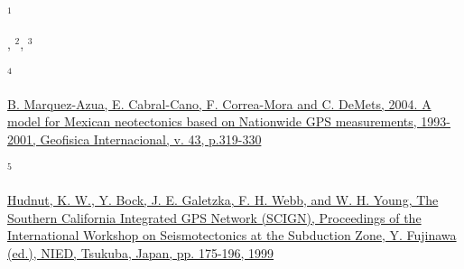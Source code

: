 \begin{landscape}
\begin{minipage}{0.9\linewidth}
      \hypertarget{Hudnut}{${}^1$}\citet{Hudnut:2002},
      \hypertarget{Garnier}{${}^2$}\citet{Garnier:2021}, 
      \hypertarget{Graham}{${}^3$}\citet{Graham:2016}
      
      \hypertarget{Marquez}{${}^4$}\href{https://doi.org/10.7283/T58S4N9N}{B. Marquez-Azua, E. Cabral-Cano, F. Correa-Mora and C. DeMets, 2004. A model for Mexican neotectonics based on Nationwide GPS measurements, 1993-2001, Geofisica Internacional, v. 43, p.319-330}
      
      \hypertarget{Hudnut2}{${}^5$}\href{https://doi.org/10.7283/T5668BHN}{Hudnut, K. W., Y. Bock, J. E. Galetzka, F. H. Webb, and W. H. Young, The Southern California Integrated GPS Network (SCIGN), Proceedings of the International Workshop on Seismotectonics at the Subduction Zone, Y. Fujinawa (ed.), NIED, Tsukuba, Japan, pp. 175-196, 1999}
    
    
    
    \end{minipage}
  \end{landscape}
  \clearpage
  \twocolumn
     
     
